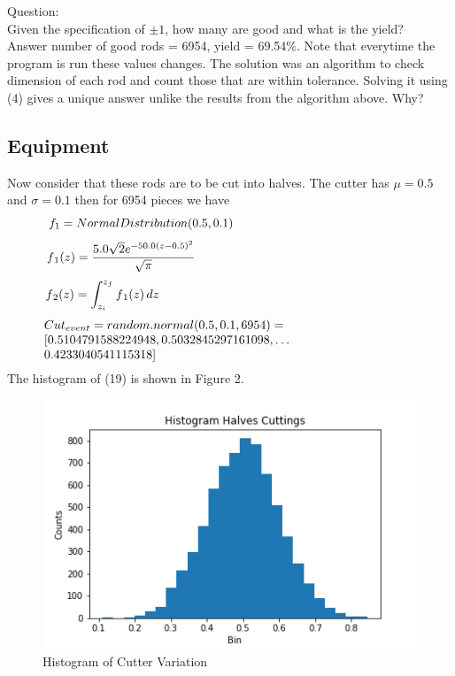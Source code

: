 \documentclass[10pt,journal,compsoc]{IEEEtran} \ifCLASSOPTIONcompsoc
\begin{document}
\noindent Question: \\ Given the specification of $\pm 1$, how many are good and what is the    yield? \\ 
\noindent Answer number of good rods = 6954, yield = 69.54\%. Note that everytime the program is run these    values changes. The solution was an algorithm to check dimension of each    rod and count those that are within tolerance. Solving it using (4) gives    a unique answer unlike the results from the algorithm above. Why?   \subsection{Equipment}    Now consider that these rods are to be cut into    halves. The cutter has $\mu = 0.5 $ and $\sigma = 0.1 $ then for 6954 pieces we have 
\begin{equation}
\begin{minipage}{300pt}
 $\displaystyle f_{1} = NormalDistribution(0.5, 0.1)$  
\end{minipage}
\end{equation}
\begin{equation}
\begin{minipage}{300pt}
 $\displaystyle f{_1}(z) = \frac{5.0 \sqrt{2} e^{- 50.0 \left(z - 0.5\right)^{2}}}{\sqrt{\pi}}$  
\end{minipage}
\end{equation}
\begin{equation}
\begin{minipage}{300pt}
 $\displaystyle f{_2}(z) = \int_{z_{i}}^{z_{f}} f{_1}(z)\, dz$  
\end{minipage}
\end{equation}
\begin{equation}
\begin{minipage}{300pt}
 $\displaystyle Cut_{event} = random.normal(0.5, 0.1, 6954) =  \newline  [0.5104791588224948, 0.5032845297161098, \dots \\ 0.4233040541115318] $  
\end{minipage}
\end{equation}
\noindent The histogram of (19) is shown in Figure 2.
\begin{figure}[H]
\centering\includegraphics[width=1\linewidth,height=0.25\textheight]{Fig02}
\caption{Histogram of Cutter Variation}
\label{fig:Fig02}
\end{figure}
\end{document}

